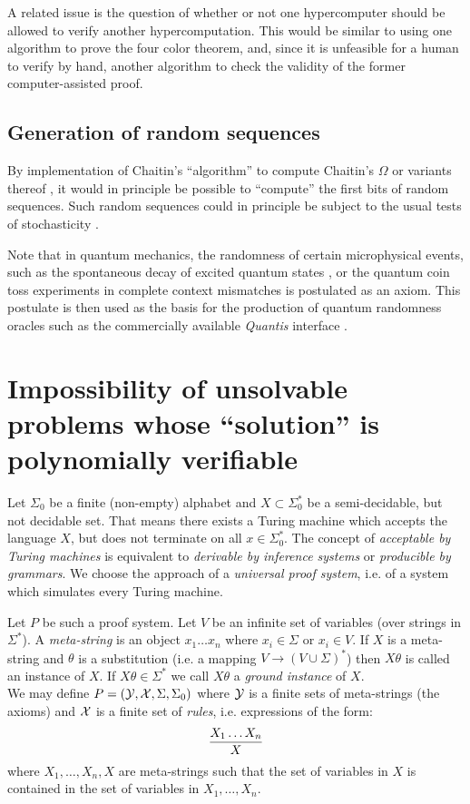 \documentclass[12pt]{article}
\begin{document}
A related issue is the question of whether or not one hypercomputer should be allowed to verify another hypercomputation.
This would be similar to using one algorithm to prove the four color theorem,
and, since it is unfeasible for a human to verify by hand,
another algorithm to check the validity of the former computer-assisted proof.

\subsection{Generation of random sequences}
By implementation of Chaitin's ``algorithm'' to compute
Chaitin's $\Omega$  \cite{chaitin:01}
or variants thereof \cite{calude:94},
it would in principle be possible to ``compute'' the first bits of random sequences.
Such random sequences could in principle be subject to the usual
tests of stochasticity \cite{svozil-qct,calude-dinneen05}.

Note that in quantum mechanics, the randomness of certain microphysical events,
such as the spontaneous decay of excited quantum states
\cite{erber-95,berkeland:052103},
or the quantum coin toss experiments in complete context mismatches
\cite{svozil-qct} is postulated as an axiom.
This postulate is then used as the basis for the production of quantum randomness oracles
such as the commercially available {\it Quantis}\textsuperscript{\texttrademark} interface \cite{Quantis}.


\section{Impossibility of unsolvable problems whose ``solution'' is polynomially verifiable}
%
Let $\Sigma_0$ be a finite (non-empty) alphabet and $X \subset \Sigma_0^*$
be a semi-decidable, but not decidable set. That means there exists a
Turing machine which accepts
the language $X$, but does not terminate on all $x \in \Sigma_0^*$.
The concept
of {\em acceptable by Turing machines} is equivalent to {\em derivable by
inference systems} or {\em producible by grammars}. We choose the approach of
a {\em universal proof system}, i.e. of a system which simulates every
Turing machine.

Let $P$ be such a proof system. Let $V$ be an infinite set of variables
(over strings in $\Sigma^*$). A {\em meta-string} is an object
$x_1 \ldots x_n$ where
$x_i \in \Sigma$ or $x_i \in V$. If $X$ is a meta-string and $\theta$ is a
substitution (i.e. a mapping $V \to (V \cup \Sigma)^*$)
then $X\theta$ is called an
instance of $X$. If $X\theta \in \Sigma^*$ we call $X\theta$ a {\em ground
instance} of $X$.\\[1ex]
%
We may define $P = ({\cal Y},{\cal X},\Sigma,\Sigma_0)$ where
${\cal Y}$ is a finite sets of meta-strings (the axioms) and
${\cal X}$ is a finite set of
{\em rules}, i.e. expressions of the form:
\[
{X_1 \ldots X_n\over X}
\]
%
where $X_1,\ldots,X_n,X$ are meta-strings such that the set of variables in $X$ is
contained in the set of variables in $X_1,\ldots,X_n$.
\end{document}
